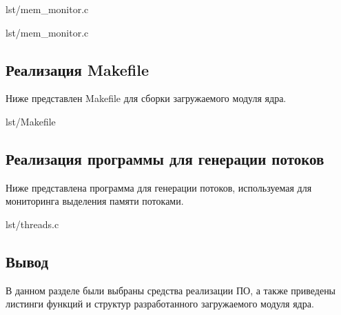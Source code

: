 \begin{lstinputlisting}[
        label={lst:},
        caption={Функция init загружаемого модуля},
        firstline=260,
        lastline=301,
    ]{lst/mem_monitor.c}
\end{lstinputlisting}


\begin{lstinputlisting}[
        label={lst:},
        caption={Функция exit загружаемого модуля},
        firstline=303,
        lastline=322,
    ]{lst/mem_monitor.c}
\end{lstinputlisting}


\subsection{Реализация Makefile}

Ниже представлен Makefile для сборки загружаемого модуля ядра.

\begin{lstinputlisting}[
        label={lst:Makefile},
        caption={Makefile},
        firstline=1,
        lastline=9,
    ]{lst/Makefile}
\end{lstinputlisting}

\newpage

\subsection{Реализация программы для генерации потоков}

Ниже представлена программа для генерации потоков, используемая для мониторинга выделения памяти потоками.

\begin{lstinputlisting}[
        label={lst:threads},
        caption={threads.c},
        firstline=1,
        lastline=25,
    ]{lst/threads.c}
\end{lstinputlisting}

\subsection*{Вывод}

В данном разделе были выбраны средства реализации ПО, а также приведены листинги функций и структур разработанного загружаемого модуля ядра.
